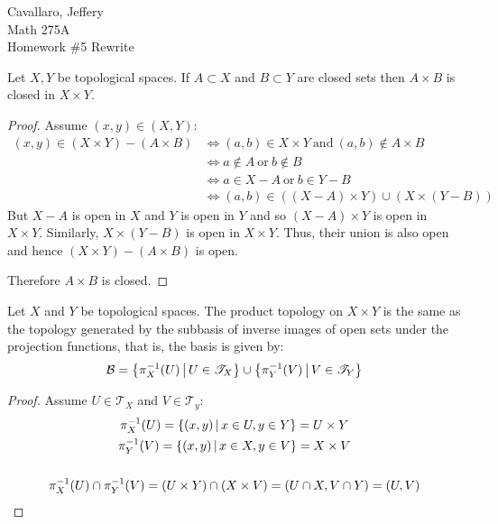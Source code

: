 \documentclass[letterpaper,12pt,fleqn]{article}
\newcommand{\p}{\pi}
\newcommand{\B}{\mathcal{B}}
\newcommand{\T}{\mathscr{T}}
\begin{document}
Cavallaro, Jeffery \\
Math 275A \\
Homework \#5 Rewrite

\bigskip

\begin{theorem}[Exercise 3.34]
  Let \(X,Y\) be topological spaces.  If \(A\subset X\) and \(B\subset Y\) are closed sets then \(A\times B\)
  is closed in \(X\times Y\).
\end{theorem}

\begin{proof}
  Assume \((x,y)\in(X,Y)\):
  \begin{align*}
    (x,y)\in(X\times Y)-(A\times B) &\iff (a,b)\in X\times Y\ \text{and}\ (a,b)\notin A\times B \\
    &\iff a\notin A\ \text{or}\ b\notin B \\
    &\iff a\in X-A\ \text{or}\ b\in Y-B \\
    &\iff (a,b)\in((X-A)\times Y)\cup(X\times(Y-B))
  \end{align*}
  But \(X-A\) is open in \(X\) and \(Y\) is open in \(Y\) and so \((X-A)\times Y\) is open in \(X\times Y\).
  Similarly, \(X\times(Y-B)\) is open in \(X\times Y\).  Thus, their union is also open and hence
  \((X\times Y)-(A\times B)\) is open.

  Therefore \(A\times B\) is closed.
\end{proof}

\begin{theorem}[Exercise 3.35]
  Let \(X\) and \(Y\) be topological spaces.  The product topology on \(X\times Y\) is the same as the topology
  generated by the subbasis of inverse images of open sets under the projection functions, that is, the basis is
  given by:
  \[\B=\setb{\p_X^{-1}(U)}{U\in\T_X}\cup\setb{\p_Y^{-1}(V)}{V\in\T_Y}\]
\end{theorem}

\begin{proof}
  Assume \(U\in\T_X\) and \(V\in\T_y\):
  \begin{gather*}
    \p_X^{-1}(U)=\setb{(x,y)}{x\in U,y\in Y}=U\times Y \\
    \p_Y^{-1}(V)=\setb{(x,y)}{x\in X,y\in V}=X\times V \\
    \\
    \p_X^{-1}(U)\cap\p_Y^{-1}(V)=(U\times Y)\cap(X\times V)=(U\cap X,V\cap Y)=(U,V)
  \end{gather*}
\end{proof}
\end{document}
